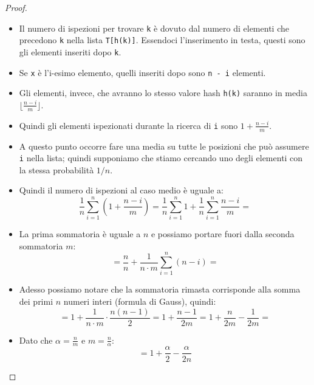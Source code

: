 \documentclass{article}
\begin{document}
\begin{proof}
    $ $\newline
    \begin{itemize}
        \item Il numero di ispezioni per trovare \verb|k| è dovuto dal numero di elementi che precedono \verb|k| nella lista \verb|T[h(k)]|. Essendoci l'inserimento in testa, questi sono gli elementi inseriti dopo \verb|k|.
        \item Se \verb|x| è l'i-esimo elemento, quelli inseriti dopo sono \verb|n - i| elementi.
        \item Gli elementi, invece, che avranno lo stesso valore hash \verb|h(k)| saranno in media $\lfloor \frac{n - i}{m} \rfloor$.
        \item Quindi gli elementi ispezionati durante la ricerca di \verb|i| sono $1 + \frac{n - i}{m}$.
        \item A questo punto occorre fare una media su tutte le posizioni che può assumere \verb|i| nella lista; quindi supponiamo che stiamo cercando uno degli elementi con la stessa probabilità $1/n$.
        \item Quindi il numero di ispezioni al caso medio è uguale a:
            \begin{equation*}
                \frac{1}{n} \sum_{i = 1}^n (1 + \frac{n - i}{m}) = \frac{1}{n} \sum_{i = 1}^n 1 + \frac{1}{n} \sum_{i = 1}^n \frac{n - i}{m} =
            \end{equation*}
        \item La prima sommatoria è uguale a $n$ e possiamo portare fuori dalla seconda sommatoria $m$:
            \begin{equation*}
                = \frac{n}{n} + \frac{1}{n \cdot m} \sum_{i = 1}^n (n - i) =
            \end{equation*}
        \item Adesso possiamo notare che la sommatoria rimasta corrisponde alla somma dei primi $n$ numeri interi (formula di Gauss), quindi:
            \begin{equation*}
                = 1 + \frac{1}{n \cdot m} \cdot \frac{n(n-1)}{2} = 1 + \frac{n - 1}{2m} = 1 + \frac{n}{2m} - \frac{1}{2m} =
            \end{equation*}
        \item Dato che $\alpha = \frac{n}{m}$ e $m = \frac{n}{\alpha}$:
            \begin{equation*}
                = 1 + \frac{\alpha}{2} - \frac{\alpha}{2n}
            \end{equation*}
    \end{itemize}
\end{proof}
\end{document}
